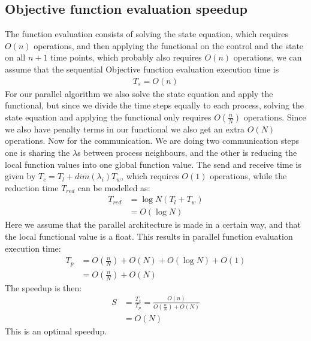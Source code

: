 \subsection{Objective function evaluation speedup}
The function evaluation consists of solving the state equation, which requires $O(n)$ operations, and then applying the functional on the control and the state on all $n+1$ time points, which probably also requires $O(n)$ operations, we can assume that the sequential Objective function evaluation execution time is 
\begin{align*}
T_s = O(n)
\end{align*}
For our parallel algorithm we also solve the state equation and apply the functional, but since we divide the time steps equally to each process, solving the state equation and applying the functional only requires $O(\frac{n}{N})$ operations. Since we also have penalty terms in our functional we also get an extra $O(N)$ operations. Now for the communication. We are doing two communication steps one is sharing the $\lambda$s between process neighbours, and the other is reducing the local function values into one global function value. The send and receive time is given by $T_c = T_l + \textit{dim}(\lambda_i)T_w$, which requires $O(1)$ operations, while the reduction time $T_{red}$ can be modelled as:
\begin{align*}
T_{red} &= \log N (T_l+T_w) \\
&= O(\log N)
\end{align*} 
Here we assume that the parallel architecture is made in a certain way, and that the local functional value is a float. This results in parallel function evaluation execution time:
\begin{align*}
T_p &= O(\frac{n}{N}) +O(N) + O(\log N) + O(1) \\
&=O(\frac{n}{N}) +O(N)
\end{align*}
The speedup is then:
\begin{align*}
S &= \frac{T_s}{T_p} = \frac{O(n)}{O(\frac{n}{N}) +O(N)} \\
&=O(N)
\end{align*}
This is an optimal speedup.

